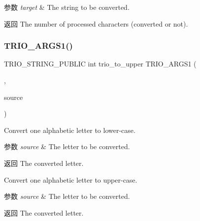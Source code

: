 \begin{DoxyParams}{参数}
{\em target} & The string to be converted. \\
\hline
\end{DoxyParams}
\begin{DoxyReturn}{返回}
The number of processed characters (converted or not). 
\end{DoxyReturn}
\mbox{\label{group___static_strings_ga8a0423dd551b1dd36ef8ebd78b264d7e}} 
\subsubsection{\texorpdfstring{T\+R\+I\+O\+\_\+\+A\+R\+G\+S1()}{TRIO\_ARGS1()}\hspace{0.1cm}{\footnotesize\ttfamily [7/7]}}
{\footnotesize\ttfamily T\+R\+I\+O\+\_\+\+S\+T\+R\+I\+N\+G\+\_\+\+P\+U\+B\+L\+IC int trio\+\_\+to\+\_\+upper T\+R\+I\+O\+\_\+\+A\+R\+G\+S1 (\begin{DoxyParamCaption}\item[{(\hyperlink{structsource}{source})}]{,  }\item[{int}]{source }\end{DoxyParamCaption})}

Convert one alphabetic letter to lower-\/case.


\begin{DoxyParams}{参数}
{\em source} & The letter to be converted. \\
\hline
\end{DoxyParams}
\begin{DoxyReturn}{返回}
The converted letter.
\end{DoxyReturn}
Convert one alphabetic letter to upper-\/case.


\begin{DoxyParams}{参数}
{\em source} & The letter to be converted. \\
\hline
\end{DoxyParams}
\begin{DoxyReturn}{返回}
The converted letter. 
\end{DoxyReturn}
\mbox{\label{group___static_strings_gab7aa5ceeea8d810e95a8dd8f1a8c1b77}} 
